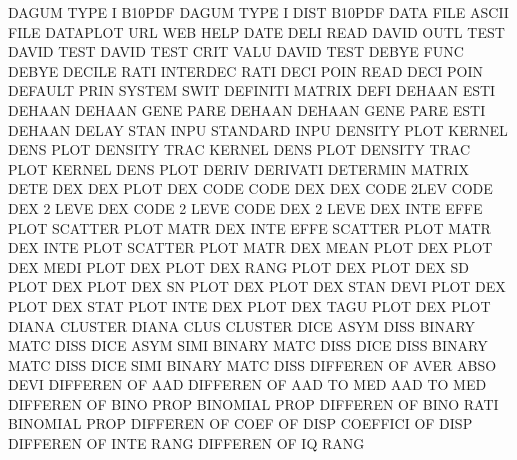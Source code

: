 DAGUM    TYPE I                         B10PDF
DAGUM    TYPE I    DIST                 B10PDF
DATA     FILE                           ASCII    FILE
DATAPLOT URL                            WEB      HELP
DATE     DELI                           READ
DAVID    OUTL TEST                      DAVID    TEST
DAVID    TEST CRIT VALU                 DAVID    TEST
DEBYE    FUNC                           DEBYE
DECILE   RATI                           INTERDEC RATI
DECI     POIN                           READ     DECI POIN 
DEFAULT  PRIN                           SYSTEM   SWIT
DEFINITI                                MATRIX   DEFI
DEHAAN   ESTI                           DEHAAN
DEHAAN   GENE PARE                      DEHAAN
DEHAAN   GENE PARE ESTI                 DEHAAN
DELAY    STAN INPU                      STANDARD INPU
DENSITY  PLOT                           KERNEL   DENS PLOT
DENSITY  TRAC                           KERNEL   DENS PLOT
DENSITY  TRAC PLOT                      KERNEL   DENS PLOT
DERIV                                   DERIVATI
DETERMIN                                MATRIX   DETE
DEX                                     DEX      PLOT
DEX      CODE                           CODE     DEX
DEX      CODE 2LEV                      CODE     DEX  2    LEVE
DEX      CODE 2    LEVE                 CODE     DEX  2    LEVE
DEX      INTE EFFE PLOT                 SCATTER  PLOT MATR
DEX      INTE EFFE                      SCATTER  PLOT MATR
DEX      INTE PLOT                      SCATTER  PLOT MATR
DEX      MEAN PLOT                      DEX      PLOT
DEX      MEDI PLOT                      DEX      PLOT
DEX      RANG PLOT                      DEX      PLOT
DEX      SD   PLOT                      DEX      PLOT
DEX      SN   PLOT                      DEX      PLOT
DEX      STAN DEVI PLOT                 DEX      PLOT
DEX      STAT PLOT INTE                 DEX      PLOT
DEX      TAGU PLOT                      DEX      PLOT
DIANA                                   CLUSTER
DIANA    CLUS                           CLUSTER
DICE     ASYM DISS                      BINARY   MATC DISS
DICE     ASYM SIMI                      BINARY   MATC DISS
DICE     DISS                           BINARY   MATC DISS
DICE     SIMI                           BINARY   MATC DISS
DIFFEREN OF   AVER ABSO DEVI            DIFFEREN OF   AAD
DIFFEREN OF   AAD  TO   MED             AAD      TO   MED
DIFFEREN OF   BINO PROP                 BINOMIAL PROP
DIFFEREN OF   BINO RATI                 BINOMIAL PROP
DIFFEREN OF   COEF OF   DISP            COEFFICI OF   DISP
DIFFEREN OF   INTE RANG                 DIFFEREN OF   IQ   RANG
